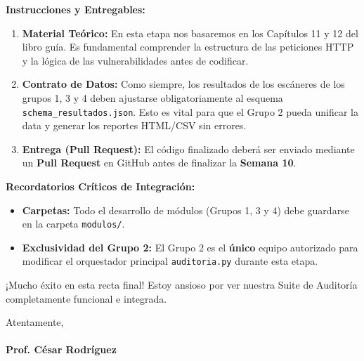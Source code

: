 \documentclass[12pt,letterpaper]{article}
\begin{document}
\vspace{0.3cm}
\noindent \textbf{Instrucciones y Entregables:}
\begin{enumerate}
    \item \textbf{Material Teórico:} En esta etapa nos basaremos en los Capítulos 11 y 12 del libro guía. Es fundamental comprender la estructura de las peticiones HTTP y la lógica de las vulnerabilidades antes de codificar.
    \item \textbf{Contrato de Datos:} Como siempre, los resultados de los escáneres de los grupos 1, 3 y 4 deben ajustarse obligatoriamente al esquema \texttt{schema\_resultados.json}. Esto es vital para que el Grupo 2 pueda unificar la data y generar los reportes HTML/CSV sin errores.
    \item \textbf{Entrega (Pull Request):} El código finalizado deberá ser enviado mediante un \textbf{Pull Request} en GitHub antes de finalizar la \textbf{Semana 10}.
\end{enumerate}

\vspace{0.3cm}
\noindent \textbf{Recordatorios Críticos de Integración:}
\begin{itemize}
    \item \textbf{Carpetas:} Todo el desarrollo de módulos (Grupos 1, 3 y 4) debe guardarse en la carpeta \texttt{modulos/}.
    \item \textbf{Exclusividad del Grupo 2:} El Grupo 2 es el \textbf{único} equipo autorizado para modificar el orquestador principal \texttt{auditoria.py} durante esta etapa.
\end{itemize}

¡Mucho éxito en esta recta final! Estoy ansioso por ver nuestra Suite de Auditoría completamente funcional e integrada.

\vspace{1cm}
\noindent Atentamente, \\
\vspace{0.5cm} \\
\textbf{Prof. César Rodríguez}
\end{document}
